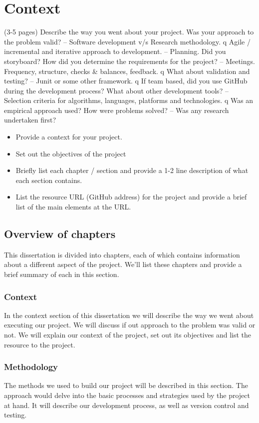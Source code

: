 \chapter{Context}
(3-5 pages)
Describe the way you went about your project. Was your
approach to the problem valid?
– Software development v/s Research methodology.
q Agile / incremental and iterative approach to development.
– Planning. Did you storyboard? How did you determine the
requirements for the project?
– Meetings. Frequency, structure, checks & balances, feedback.
q What about validation and testing?
– Junit or some other framework.
q If team based, did you use GitHub during the development
process? What about other development tools?
– Selection criteria for algorithms, languages, platforms and
technologies.
q Was an empirical approach used? How were problems solved?
– Was any research undertaken first?
\begin{itemize}
\item Provide a context for your project.
\item Set out the objectives of the project
\item Briefly list each chapter / section and provide a 1-2 line description of what each section contains.
\item List the resource URL (GitHub address) for the project and provide a brief list of the main elements at the URL.
\end{itemize}

\section{Overview of chapters}
This dissertation is divided into chapters, each of which contains information about a different aspect of the project. We'll list these chapters and provide a brief summary of each in this section. 

\subsection{Context}
In the context section of this dissertation we will describe the way we went about executing our project. We will discuss if out approach to the problem was valid or not. We will explain our context of the project, set out its objectives and list the resource to the project.

\subsection{Methodology}
The methods we used to build our project will be described in this section. The approach would delve into the basic processes and strategies used by the project at hand. It will describe our development process, as well as version control and testing.  

